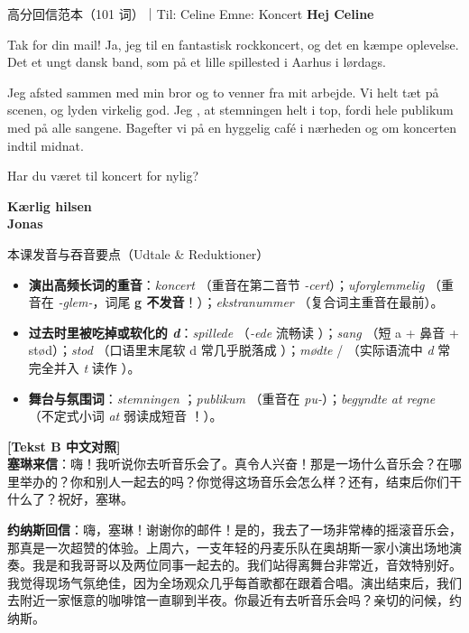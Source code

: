 \begin{emailbox}{高分回信范本（101 词）｜Til: Celine \quad Emne: Koncert}
\textbf{Hej Celine}

Tak for din mail! Ja, jeg  til en fantastisk rockkoncert, og det  en kæmpe oplevelse. Det  et ungt dansk band, som  på et lille spillested i Aarhus i lørdags.

Jeg  afsted sammen med min bror og to venner fra mit arbejde. Vi  helt tæt på scenen, og lyden  virkelig god. Jeg , at stemningen  helt i top, fordi hele publikum  med på alle sangene. Bagefter  vi på en hyggelig café i nærheden og  om koncerten indtil midnat.

Har du været til koncert for nylig?

\textbf{Kærlig hilsen}\\
\textbf{Jonas}
\end{emailbox}

\begin{tipbox}{本课发音与吞音要点（Udtale \& Reduktioner）}
\begin{itemize}
  \item \textbf{演出高频长词的重音}：\textit{koncert} （重音在第二音节 \textit{-cert}）；\textit{uforglemmelig} （重音在 \textit{-glem-}，词尾 \textbf{g 不发音}！）；\textit{ekstranummer} （复合词主重音在最前）。
  \item \textbf{过去时里被吃掉或软化的 \textit{d}}：\textit{spillede} （\textit{-ede} 流畅读 ）；\textit{sang} （短 a + 鼻音 + stød）；\textit{stod} （口语里末尾软 d 常几乎脱落成 ）；\textit{mødte}  / （实际语流中 \textit{d} 常完全并入 \textit{t} 读作 ）。
  \item \textbf{舞台与氛围词}：\textit{stemningen} ；\textit{publikum} （重音在 \textit{pu-}）；\textit{begyndte at regne} （不定式小词 \textit{at} 弱读成短音 ！）。
\end{itemize}
\end{tipbox}

\begin{transbox}
\small
\textbf{\color{NCDTeal}[Tekst B 中文对照]}\\
\textbf{塞琳来信}：嗨！我听说你去听音乐会了。真令人兴奋！那是一场什么音乐会？在哪里举办的？你和别人一起去的吗？你觉得这场音乐会怎么样？还有，结束后你们干什么了？祝好，塞琳。

\textbf{约纳斯回信}：嗨，塞琳！谢谢你的邮件！是的，我去了一场非常棒的摇滚音乐会，那真是一次超赞的体验。上周六，一支年轻的丹麦乐队在奥胡斯一家小演出场地演奏。我是和我哥哥以及两位同事一起去的。我们站得离舞台非常近，音效特别好。我觉得现场气氛绝佳，因为全场观众几乎每首歌都在跟着合唱。演出结束后，我们去附近一家惬意的咖啡馆一直聊到半夜。你最近有去听音乐会吗？亲切的问候，约纳斯。
\end{transbox}

